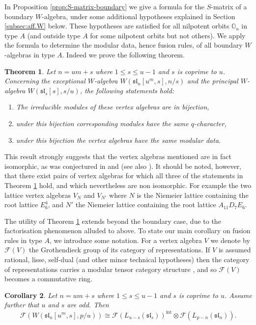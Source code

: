 \documentclass[12pt]{amsart}
\theoremstyle{plain}
\newtheorem{thm}{Theorem}[section]
\newtheorem{cor}[thm]{Corollary}
\theoremstyle{definition}
\numberwithin{equation}{section}
\newcommand{\sll}{\mathfrak{sl}}
\newcommand{\CF}{\mathcal{F}}
\newcommand{\mbo}{\mathbb{O}}
\begin{document}
In Proposition \ref{prop:S-matrix-boundary} we give a formula for the $S$-matrix of a boundary $W$-algebra, under some additional hypotheses explained in Section \ref{subsec:aff.W} below. These hypotheses are satisfied for all nilpotent orbits $\mbo_u$ in type $A$ (and outside type $A$ for some nilpotent orbits but not others). We apply the formula to determine the modular data, hence fusion rules, of all boundary $W$-algebras in type $A$. Indeed we prove the following theorem.
\begin{thm}\label{thm:main.thm.typeA}
Let $n = um+s$ where $1 \leq s \leq u-1$ and $s$ is coprime to $u$. Concerning the exceptional $W$-algebra $W(\sll_n[u^m, s], n/s)$ and the principal $W$-algebra $W(\sll_s[s], s/u)$, the following statements hold:
\begin{enumerate}
\item The irreducible modules of these vertex algebras are in bijection,

\item under this bijection corresponding modules have the same $q$-character,

\item under this bijection the vertex algebras have the same modular data.
\end{enumerate}
\end{thm}
This result strongly suggests that the vertex algebras mentioned are in fact isomorphic, as was conjectured in {\cite[Conjecture 8.11]{AEM2024}} and {\cite{XY2021}} (see also \cite{CFLN2025, GJ2025, BN2025}). It should be noted, however, that there exist pairs of vertex algebras for which all three of the statements in Theorem \ref{thm:main.thm.typeA} hold, and which nevertheless are non isomorphic. For example the two lattice vertex algebras $V_{N}$ and $V_{N'}$ where $N$ is the Niemeier lattice containing the root lattice $E_6^4$, and $N'$ the Niemeier lattice containing the root lattice $A_{11} D_7 E_6$.

The utility of Theorem \ref{thm:main.thm.typeA} extends beyond the boundary case, due to the factorisation phenomenon alluded to above. To state our main corollary on fusion rules in type $A$, we introduce some notation. For a vertex algebra $V$ we denote by $\CF(V)$ the Grothendieck group of its category of representations. If $V$ is assumed rational, lisse, self-dual (and other minor technical hypotheses) then the category of representations carries a modular tensor category structure \cite{Huang-rigidity}, and so $\CF(V)$ becomes a commutative ring.
\begin{cor}\label{cor:intro}
Let $n = um+s$ where $1 \leq s \leq u-1$ and $s$ is coprime to $u$. Assume further that $u$ and $s$ are odd. Then
\[
\CF(W(\sll_n[u^m, s], p/u)) \cong \CF(L_{u-s}(\sll_s))^{\text{int}} \otimes \CF(L_{p-n}(\sll_n)).
\]
\end{cor}
\end{document}
